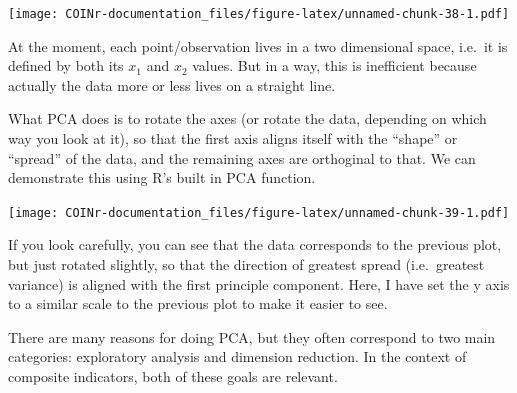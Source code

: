 \documentclass[
]{book}
\newenvironment{Shaded}{\begin{snugshade}}{\end{snugshade}}
\newcommand{\AttributeTok}[1]{\textcolor[rgb]{0.77,0.63,0.00}{#1}}
\newcommand{\CommentTok}[1]{\textcolor[rgb]{0.56,0.35,0.01}{\textit{#1}}}
\newcommand{\DecValTok}[1]{\textcolor[rgb]{0.00,0.00,0.81}{#1}}
\newcommand{\FunctionTok}[1]{\textcolor[rgb]{0.00,0.00,0.00}{#1}}
\newcommand{\NormalTok}[1]{#1}
\newcommand{\OtherTok}[1]{\textcolor[rgb]{0.56,0.35,0.01}{#1}}
\newcommand{\SpecialCharTok}[1]{\textcolor[rgb]{0.00,0.00,0.00}{#1}}
\begin{document}
\texttt{[image: COINr-documentation\_files/figure-latex/unnamed-chunk-38-1.pdf]}

At the moment, each point/observation lives in a two dimensional space, i.e.~it is defined by both its \(x_1\) and \(x_2\) values. But in a way, this is inefficient because actually the data more or less lives on a straight line.

What PCA does is to rotate the axes (or rotate the data, depending on which way you look at it), so that the first axis aligns itself with the ``shape'' or ``spread'' of the data, and the remaining axes are orthoginal to that. We can demonstrate this using R's built in PCA function.

\begin{Shaded}
\end{Shaded}

\texttt{[image: COINr-documentation\_files/figure-latex/unnamed-chunk-39-1.pdf]}

If you look carefully, you can see that the data corresponds to the previous plot, but just rotated slightly, so that the direction of greatest spread (i.e.~greatest variance) is aligned with the first principle component. Here, I have set the y axis to a similar scale to the previous plot to make it easier to see.

There are many reasons for doing PCA, but they often correspond to two main categories: exploratory analysis and dimension reduction. In the context of composite indicators, both of these goals are relevant.
\end{document}
